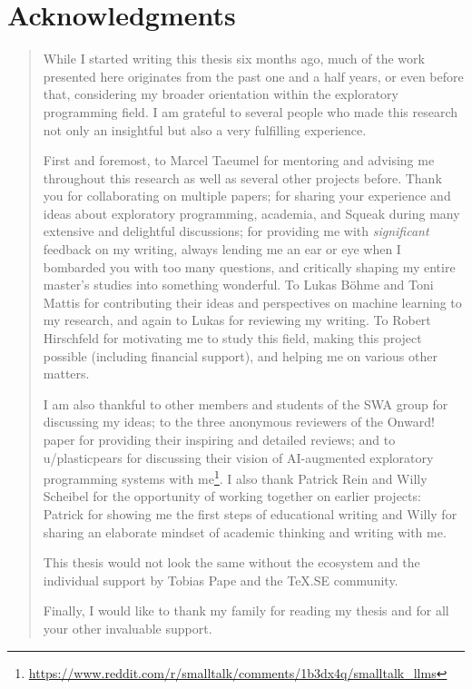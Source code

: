 
\begingroup
\let\raggedsection\centering

\chapter*{Acknowledgments}
\label{cha:acknowledgments}
\endgroup
\begin{quotation}
	\noindent
	While I started writing this thesis six months ago, much of the work presented here originates from the past one and a half years, or even before that, considering my broader orientation within the exploratory programming field.
	I am grateful to several people who made this research not only an insightful but also a very fulfilling experience.

	First and foremost, to Marcel Taeumel for mentoring and advising me throughout this research as well as several other projects before. Thank you for collaborating on multiple papers; for sharing your experience and ideas about exploratory programming, academia, and Squeak during many extensive and delightful discussions; for providing me with \emph{significant} feedback on my writing, always lending me an ear or eye when I bombarded you with too many questions, and critically shaping my entire master's studies into something wonderful.
	To Lukas Böhme and Toni Mattis for contributing their ideas and perspectives on machine learning to my research, and again to Lukas for reviewing my writing.
	To Robert Hirschfeld for motivating me to study this field, making this project possible (including financial support), and helping me on various other matters.

	I am also thankful to other members and students of the SWA group for discussing my ideas; to the three anonymous reviewers of the Onward! paper for providing their inspiring and detailed reviews; and to u/plasticpears for discussing their vision of AI-augmented exploratory programming systems with me\footnote{\url{https://www.reddit.com/r/smalltalk/comments/1b3dx4q/smalltalk_llms}}. %
	I also thank Patrick Rein and Willy Scheibel for the opportunity of working together on earlier projects: Patrick for showing me the first steps of educational writing and Willy for sharing an elaborate mindset of academic thinking and writing with me.

	This thesis would not look the same without the ecosystem and the individual support by Tobias Pape and the \TeX.SE community.

	Finally, I would like to thank my family for reading my thesis and for all your other invaluable support.
\end{quotation}
